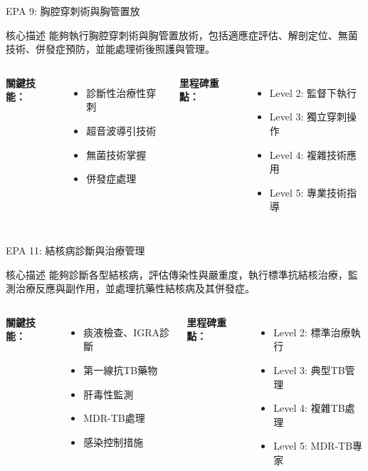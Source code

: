 \documentclass[aspectratio=169]{beamer}
\begin{document}
\begin{frame}{EPA 9: 胸腔穿刺術與胸管置放}
\begin{alertblock}{核心描述}
能夠執行胸腔穿刺術與胸管置放術，包括適應症評估、解剖定位、無菌技術、併發症預防，並能處理術後照護與管理。
\end{alertblock}

\begin{columns}[c]
\textbf{關鍵技能：}
\begin{itemize}
\item 診斷性治療性穿刺
\item 超音波導引技術
\item 無菌技術掌握
\item 併發症處理
\end{itemize}

\textbf{里程碑重點：}
\begin{itemize}
\item Level 2: 監督下執行
\item Level 3: 獨立穿刺操作
\item Level 4: 複雜技術應用
\item Level 5: 專業技術指導
\end{itemize}
\end{columns}
\end{frame}

\begin{frame}{EPA 11: 結核病診斷與治療管理}
\begin{alertblock}{核心描述}
能夠診斷各型結核病，評估傳染性與嚴重度，執行標準抗結核治療，監測治療反應與副作用，並處理抗藥性結核病及其併發症。
\end{alertblock}

\begin{columns}[c]
\textbf{關鍵技能：}
\begin{itemize}
\item 痰液檢查、IGRA診斷
\item 第一線抗TB藥物
\item 肝毒性監測
\item MDR-TB處理
\item 感染控制措施
\end{itemize}

\textbf{里程碑重點：}
\begin{itemize}
\item Level 2: 標準治療執行
\item Level 3: 典型TB管理
\item Level 4: 複雜TB處理
\item Level 5: MDR-TB專家
\end{itemize}
\end{columns}
\end{frame}
\end{document}
